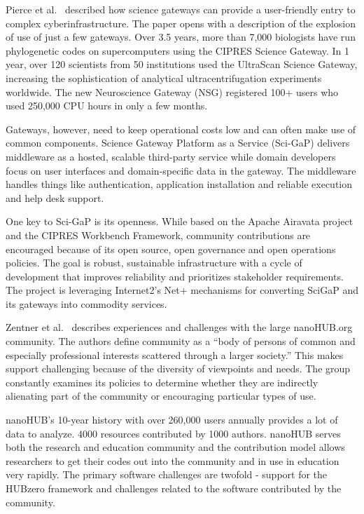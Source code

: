 \documentclass[11pt, oneside]{amsart}
\begin{document}
Pierce et al.~\cite{Pierce2_WSSSPE} described how science gateways can provide a user-friendly
entry to complex cyberinfrastructure. The paper opens with a description of the
explosion of use of just a few gateways. Over 3.5 years, more than 7,000
biologists have run phylogenetic codes on supercomputers using the CIPRES
Science Gateway. In 1 year, over 120 scientists from 50 institutions used the
UltraScan Science Gateway, increasing the sophistication of analytical
ultracentrifugation experiments worldwide. The new Neuroscience Gateway (NSG)
registered 100+ users who used 250,000 CPU hours in only a few months.

Gateways, however, need to keep operational costs low and can often make use of
common components. Science Gateway Platform as a Service (Sci-GaP) delivers
middleware as a hosted, scalable third-party service while domain developers
focus on user interfaces and domain-specific data in the gateway. The
middleware handles things like authentication, application installation and
reliable execution and help desk support.

One key to Sci-GaP is its openness. While based on the Apache Airavata project
and the CIPRES Workbench Framework, community contributions are encouraged
because of its open source, open governance and open operations policies. The
goal is robust, sustainable infrastructure with a cycle of development that
improves reliability and prioritizes stakeholder requirements. The project is
leveraging Internet2's Net+ mechanisms for converting SciGaP and its gateways
into commodity services.

Zentner et al.~\cite{Zentner_WSSSPE} describes experiences and challenges with the large
nanoHUB.org community. The authors define community as a ``body of persons of
common and especially professional interests scattered through a larger
society.'' This makes support challenging because of the diversity of
viewpoints and needs. The group constantly examines its policies to determine
whether they are indirectly alienating part of the community or encouraging
particular types of use.

nanoHUB's 10-year history with over 260,000 users annually provides a lot of
data to analyze. 4000 resources contributed by 1000 authors. nanoHUB serves
both the research and education community and the contribution model allows
researchers to get their codes out into the community and in use in education
very rapidly. The primary software challenges are twofold - support for the
HUBzero framework and challenges related to the software contributed by the
community.
\end{document}
